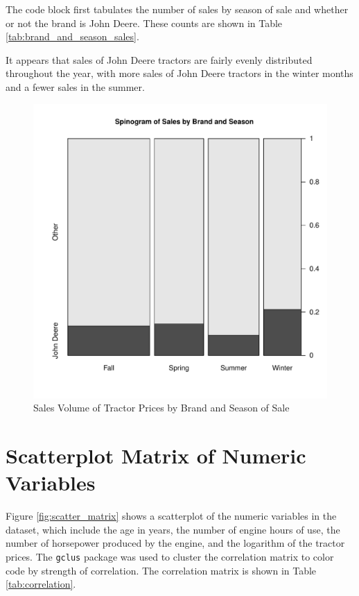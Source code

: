 \documentclass[11pt]{book}
\begin{document}
The code block first tabulates the number of sales by
season of sale and whether or not the brand is John Deere.
These counts are shown in Table \ref{tab:brand_and_season_sales}.



\pagebreak
It appears that sales of John Deere tractors are fairly evenly
distributed throughout the year,
with more sales of John Deere tractors in the winter months
and a fewer sales in the summer.


\begin{figure}[h!]
  \centering
  \includegraphics[scale = 0.5, keepaspectratio=true]{../Figures/brand_and_season_sales}
  \caption{Sales Volume of Tractor Prices by Brand and Season of Sale} \label{fig:brand_and_season_sales}
\end{figure}




\pagebreak
\section{Scatterplot Matrix of Numeric Variables}

Figure \ref{fig:scatter_matrix}
shows a scatterplot of the numeric variables in the dataset,
which include
the age in years, the number of engine hours of use,
the number of horsepower produced by the engine,
and the logarithm of the tractor prices.
The \texttt{gclus} package was used to cluster the
correlation matrix to color code by strength of correlation.
The correlation matrix is shown in Table \ref{tab:correlation}.
\end{document}
